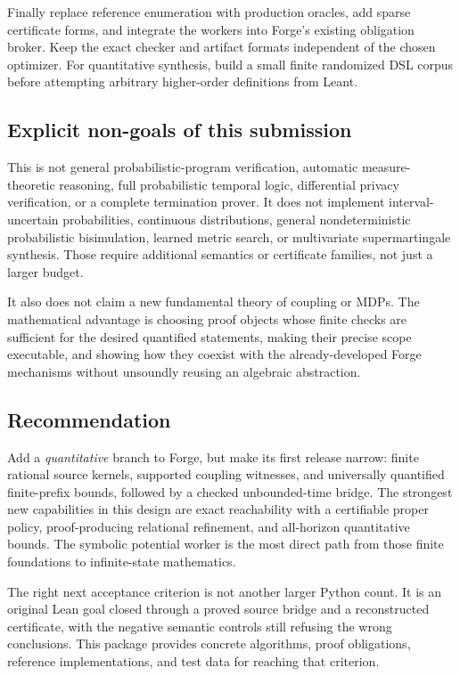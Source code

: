 \documentclass[11pt,letterpaper]{article}
\theoremstyle{definition}\newtheorem{definition}[theorem]{Definition}
\theoremstyle{remark}\newtheorem{remark}[theorem]{Remark}
\begin{document}
Finally replace reference enumeration with production oracles, add sparse certificate forms, and integrate the workers into Forge's existing obligation broker. Keep the exact checker and artifact formats independent of the chosen optimizer. For quantitative synthesis, build a small finite randomized DSL corpus before attempting arbitrary higher-order definitions from Leant.

\subsection{Explicit non-goals of this submission}
This is not general probabilistic-program verification, automatic measure-theoretic reasoning, full probabilistic temporal logic, differential privacy verification, or a complete termination prover. It does not implement interval-uncertain probabilities, continuous distributions, general nondeterministic probabilistic bisimulation, learned metric search, or multivariate supermartingale synthesis. Those require additional semantics or certificate families, not just a larger budget.

It also does not claim a new fundamental theory of coupling or MDPs. The mathematical advantage is choosing proof objects whose finite checks are sufficient for the desired quantified statements, making their precise scope executable, and showing how they coexist with the already-developed Forge mechanisms without unsoundly reusing an algebraic abstraction.

\subsection{Recommendation}
Add a \emph{quantitative} branch to Forge, but make its first release narrow: finite rational source kernels, supported coupling witnesses, and universally quantified finite-prefix bounds, followed by a checked unbounded-time bridge. The strongest new capabilities in this design are exact reachability with a certifiable proper policy, proof-producing relational refinement, and all-horizon quantitative bounds. The symbolic potential worker is the most direct path from those finite foundations to infinite-state mathematics.

The right next acceptance criterion is not another larger Python count. It is an original Lean goal closed through a proved source bridge and a reconstructed certificate, with the negative semantic controls still refusing the wrong conclusions. This package provides concrete algorithms, proof obligations, reference implementations, and test data for reaching that criterion.
\end{document}
